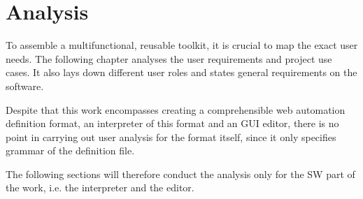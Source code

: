 \chapter{Analysis}

To assemble a multifunctional, reusable toolkit, it is crucial to map the exact user needs.
The following chapter analyses the user requirements and project use cases. 
It also lays down different user roles and states general requirements on the software.

Despite that this work encompasses creating a comprehensible web automation definition format, an interpreter of this format and an \ac{GUI} editor, 
there is no point in carrying out user analysis for the format itself, since it only specifies grammar of the definition file. 

The following sections will therefore conduct the analysis only for the \ac{SW} part of the work, i.e. the interpreter and the editor.



